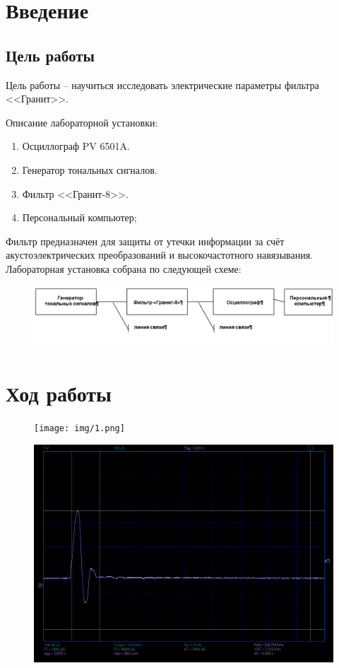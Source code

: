 \chapter{Введение}

\section{Цель работы}

Цель работы – научиться исследовать электрические параметры фильтра <<Гранит>>.

Описание лабораторной установки:
\begin{enumerate}
	\item Осциллограф PV 6501A.
	\item Генератор тональных сигналов.
	\item Фильтр <<Гранит-8>>.
	\item Персональный компьютер;
\end{enumerate}


Фильтр предназначен для защиты от утечки информации за счёт акустоэлектрических преобразований и высокочастотного навязывания. Лабораторная установка собрана по следующей схеме:

\begin{figure}[H]
	\centering
	\includegraphics[width=\textwidth]{img/scheme.png}
	\caption{}
\end{figure}


\chapter{Ход работы}


\begin{figure}[H]
	\centering
	\texttt{[image: img/1.png]}
	\caption{}
\end{figure}

\begin{figure}[H]
	\centering
	\includegraphics[width=\textwidth]{img/2.png}
	\caption{}
\end{figure}

